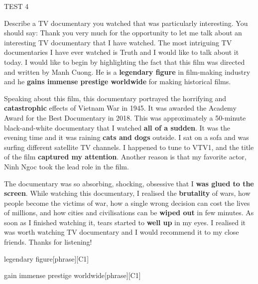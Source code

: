 \begin{glossarymc}[Cambridge 11]
\begin{test}{TEST 4}
\begin{qa}{Describe a TV documentary you watched that was particularly interesting. You should say:}
    Thank you very much for the opportunity to let me talk about an interesting TV documentary that I have watched. The most intriguing TV documentaries I have ever watched is Truth and I would like to talk about it today. I would like to begin by highlighting the fact that this film was directed and written by Manh Cuong. He is a \textbf{legendary figure} in film-making industry and he \textbf{gains immense prestige worldwide} for making historical films.  

    Speaking about this film, this documentary portrayed the horrifying and \textbf{catastrophic} effects of Vietnam War in 1945. It was awarded the Academy Award for the Best Documentary in 2018. This was approximately a 50-minute black-and-white documentary that I watched \textbf{all of a sudden}. It was the evening time and it was raining \textbf{cats and dogs} outside. I sat on a sofa and was surfing different satellite TV channels. I happened to tune to VTV1, and the title of the film \textbf{captured my attention}. Another reason is that my favorite actor, Ninh Ngoc took the lead role in the film.  

    The documentary was so absorbing, shocking, obsessive that I \textbf{was glued to the screen}. While watching this documentary, I realised the \textbf{brutality} of wars, how people become the victims of war, how a single wrong decision can cost the lives of millions, and how cities and civilisations can be \textbf{wiped out} in few minutes. As soon as I finished watching it, tears started to \textbf{well up} in my eyes. I realised it was worth watching TV documentary and I would recommend it to my close friends. Thanks for listening!
    \end{qa}

        \begin{VocabExplain}[Part 2]
            \begin{ExplainCard}{legendary figure}[phrase][C1]
            \end{ExplainCard}

            \begin{ExplainCard}{gain immense prestige worldwide}[phrase][C1]
            \end{ExplainCard}


\end{VocabExplain}
\end{test}
\end{glossarymc}
